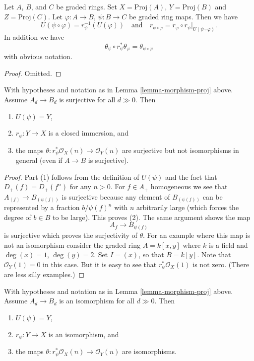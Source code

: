 \begin{lemma}
\label{lemma-morphism-proj-transitive}
Let $A$, $B$, and $C$ be graded rings.
Set $X = \text{Proj}(A)$, $Y = \text{Proj}(B)$ and $Z = \text{Proj}(C)$.
Let $\varphi : A \to B$, $\psi : B \to C$ be graded ring maps.
Then we have
$$
U(\psi \circ \varphi) = r_\psi^{-1}(U(\varphi))
\quad
\text{and}
\quad
r_{\psi \circ \varphi}
=
r_\varphi \circ r_\psi|_{U(\psi \circ \varphi)}.
$$
In addition we have
$$
\theta_\psi \circ r_\psi^*\theta_\varphi
=
\theta_{\psi \circ \varphi}
$$
with obvious notation.
\end{lemma}

\begin{proof}
Omitted.
\end{proof}

\begin{lemma}
\label{lemma-surjective-graded-rings-map-proj}
With hypotheses and notation as in Lemma \ref{lemma-morphism-proj} above.
Assume $A_d \to B_d$ is surjective for all $d \gg 0$. Then
\begin{enumerate}
\item $U(\psi) = Y$,
\item $r_\psi : Y \to X$ is a closed immersion, and
\item the maps $\theta : r_\psi^*\mathcal{O}_X(n) \to \mathcal{O}_Y(n)$
are surjective but not isomorphisms in general (even if $A \to B$ is
surjective).
\end{enumerate}
\end{lemma}

\begin{proof}
Part (1) follows from the definition of $U(\psi)$ and the fact that
$D_{+}(f) = D_{+}(f^n)$ for any $n > 0$. For $f \in A_{+}$ homogeneous
we see that $A_{(f)} \to B_{(\psi(f))}$ is surjective because
any element of $B_{(\psi(f))}$ can be represented by a fraction
$b/\psi(f)^n$ with $n$ arbitrarily large (which forces the degree of
$b \in B$ to be large). This proves (2).
The same argument shows the map
$$
A_f \to B_{\psi(f)}
$$
is surjective which proves the surjectivity of $\theta$.
For an example where this map is not an isomorphism
consider the graded ring $A = k[x, y]$ where $k$ is a field
and $\deg(x) = 1$, $\deg(y) = 2$. Set $I = (x)$, so that
$B = k[y]$. Note that $\mathcal{O}_Y(1) = 0$ in this case.
But it is easy to see that $r_\psi^*\mathcal{O}_X(1)$
is not zero. (There are less silly examples.)
\end{proof}

\begin{lemma}
\label{lemma-eventual-iso-graded-rings-map-proj}
With hypotheses and notation as in Lemma \ref{lemma-morphism-proj} above.
Assume $A_d \to B_d$ is an isomorphism for all $d \gg 0$. Then
\begin{enumerate}
\item $U(\psi) = Y$,
\item $r_\psi : Y \to X$ is an isomorphism, and
\item the maps $\theta : r_\psi^*\mathcal{O}_X(n) \to \mathcal{O}_Y(n)$
are isomorphisms.
\end{enumerate}
\end{lemma}

